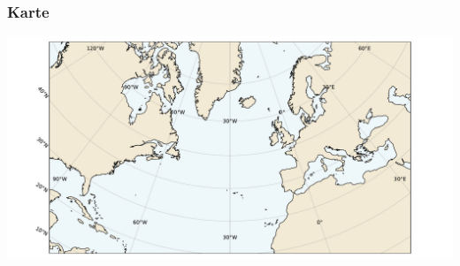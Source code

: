 

\begin{frame}
  \frametitle{Karte}
  \includegraphics[width=\textwidth]{../images/weather/map.pdf}
\end{frame}


